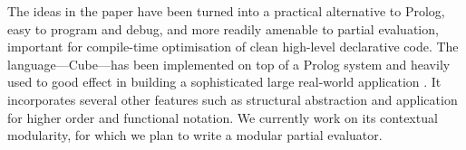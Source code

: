 \documentclass{tlp}
\newcommand{\cube}{\textsf{Cube}}
\begin{document}
The ideas in the paper have been turned into a practical alternative to Prolog, easy to
program and debug, and more readily amenable to partial evaluation,
important for compile-time optimisation of clean high-level declarative code. The
language---\cube{}---has been implemented on top of a Prolog system and heavily
used to good effect in building a sophisticated large real-world application
\cite{po:03:iispp}.  It incorporates several other features such as structural
abstraction and application \cite{po:02:saalp} for higher order and functional
notation.  We currently work on its contextual modularity, for which we plan to write a modular
partial evaluator.


\end{document}
